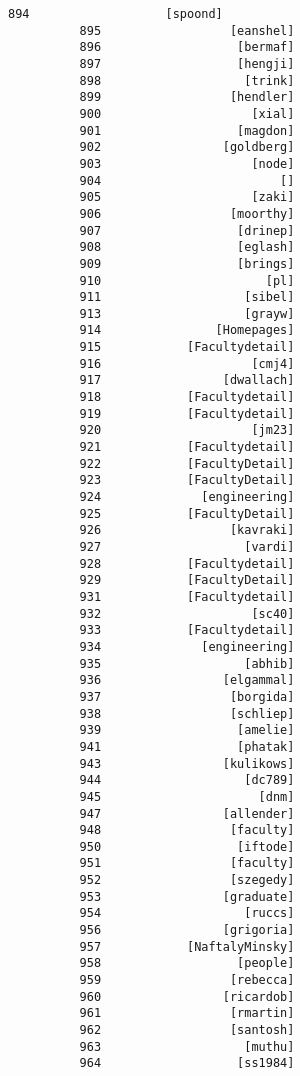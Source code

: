 \documentclass[11pt]{article}
\begin{document}
\begin{Verbatim}[commandchars=\\\{\}]
          894                   [spoond]
          895                  [eanshel]
          896                   [bermaf]
          897                   [hengji]
          898                    [trink]
          899                  [hendler]
          900                     [xial]
          901                   [magdon]
          902                 [goldberg]
          903                     [node]
          904                         []
          905                     [zaki]
          906                  [moorthy]
          907                   [drinep]
          908                   [eglash]
          909                   [brings]
          910                       [pl]
          911                    [sibel]
          913                    [grayw]
          914                [Homepages]
          915            [Facultydetail]
          916                     [cmj4]
          917                 [dwallach]
          918            [Facultydetail]
          919            [Facultydetail]
          920                     [jm23]
          921            [Facultydetail]
          922            [FacultyDetail]
          923            [FacultyDetail]
          924              [engineering]
          925            [FacultyDetail]
          926                  [kavraki]
          927                    [vardi]
          928            [Facultydetail]
          929            [FacultyDetail]
          931            [Facultydetail]
          932                     [sc40]
          933            [Facultydetail]
          934              [engineering]
          935                    [abhib]
          936                 [elgammal]
          937                  [borgida]
          938                  [schliep]
          939                   [amelie]
          941                   [phatak]
          943                 [kulikows]
          944                    [dc789]
          945                      [dnm]
          947                 [allender]
          948                  [faculty]
          950                   [iftode]
          951                  [faculty]
          952                  [szegedy]
          953                 [graduate]
          954                    [ruccs]
          956                 [grigoria]
          957            [NaftalyMinsky]
          958                   [people]
          959                  [rebecca]
          960                 [ricardob]
          961                  [rmartin]
          962                  [santosh]
          963                    [muthu]
          964                   [ss1984]

\end{Verbatim}
\end{document}
